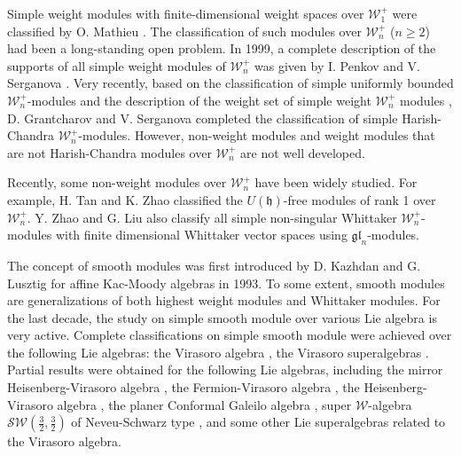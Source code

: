 \documentclass[12pt, a4paper]{amsart}
\theoremstyle{Theorem}
\theoremstyle{Theorem}
\numberwithin{equation}{section}
\begin{document}
Simple weight modules with finite-dimensional weight spaces over $\mathcal{W}_{1}^{+}$ were classified  by O. Mathieu \cite{M}. The classification of such modules over $\mathcal{W}_{n}^{+}$ ($n\geq2$) had been a long-standing open problem. In 1999, a complete description of the supports of all simple weight modules of $\mathcal{W}_{n}^{+}$ was given by I. Penkov and V. Serganova  \cite{PS}.
Very recently, based on the classification of simple uniformly bounded  $\mathcal{W}_{n}^{+}$-modules \cite{XL} and the description of the weight set of simple weight  $\mathcal{W}_{n}^{+}$ modules \cite{PS}, D. Grantcharov and V. Serganova \cite{GS} completed the classification of simple Harish-Chandra  $\mathcal{W}_{n}^{+}$-modules. However, non-weight modules and weight modules that are not Harish-Chandra modules over $\mathcal{W}_{n}^{+}$ are not well developed.

Recently, some non-weight modules over $\mathcal{W}_{n}^{+}$ have been widely studied. For example, H. Tan and K. Zhao \cite{TZ} classified the $U(\mathfrak{h})$-free modules of rank 1 over $\mathcal{W}_{n}^{+}$. Y. Zhao and G. Liu \cite{ZL} also classify all simple non-singular Whittaker $\mathcal{W}_{n}^{+}$-modules with finite dimensional Whittaker vector spaces using $\mathfrak{gl}_{n}$-modules.


The concept of smooth modules was first introduced  by D. Kazhdan and G. Lusztig  for   affine Kac-Moody algebras \cite{KL1, KL2} in 1993.
To some extent, smooth modules are generalizations of both highest weight modules and Whittaker modules.
For the last decade, the study on simple smooth  module over various Lie algebra is very active. Complete classifications on simple smooth  module were achieved over the following Lie algebras:  the Virasoro algebra   \cite{MZ}, the Virasoro superalgebras  \cite{LPX, CSYZ}. Partial results were obtained  for the following Lie algebras, including
the mirror  Heisenberg-Virasoro algebra   \cite{LPXZ}, the Fermion-Virasoro algebra   \cite{XZ},  the Heisenberg-Virasoro algebra   \cite{TYZ}, the planer Conformal Galeilo algebra   \cite{GG}, super $\mathscr{W}$-algebra $\mathscr{SW}(\frac{3}{2},\frac{3}{2})$ of Neveu-Schwarz type   \cite{LS}, and some other Lie superalgebras related to the Virasoro algebra.
\end{document}
